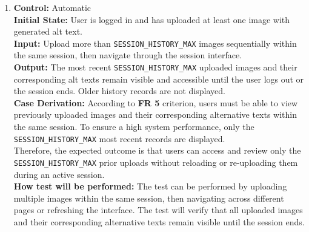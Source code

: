 \documentclass[12pt, titlepage]{article}
\begin{document}
\begin{enumerate}[label=FR-ST \arabic*., wide=0pt, leftmargin=*]
  \item{}
    {\bf Control:} Automatic\\
    {\bf Initial State:} User is logged in and has uploaded at least one
    image with generated alt text.\\
    {\bf Input:} Upload more than \texttt{SESSION\_HISTORY\_MAX} images sequentially within the same
    session, then navigate through the session interface.\\
    {\bf Output:} The most recent \texttt{SESSION\_HISTORY\_MAX} uploaded images and their
    corresponding alt texts remain visible and accessible until the
    user logs out or the session ends. Older history records are not displayed. \\
    {\bf  Case Derivation:} According to \textbf{FR 5} criterion, users must be 
    able to view previously uploaded images and their corresponding alternative texts within the same session. To ensure a high system performance, 
    only the \texttt{SESSION\_HISTORY\_MAX} most recent records are displayed. \\
    Therefore, the expected outcome is that users can access and review only the \texttt{SESSION\_HISTORY\_MAX} prior uploads
    without reloading or re-uploading them during an active session.\\
    {\bf How test will be performed:} The test can be performed by
    uploading multiple images within the same session, then
    navigating across different pages or refreshing the interface.
    The test will verify that all uploaded images and their
    corresponding alternative texts remain visible until the session ends.\\


\end{enumerate}
\end{document}
